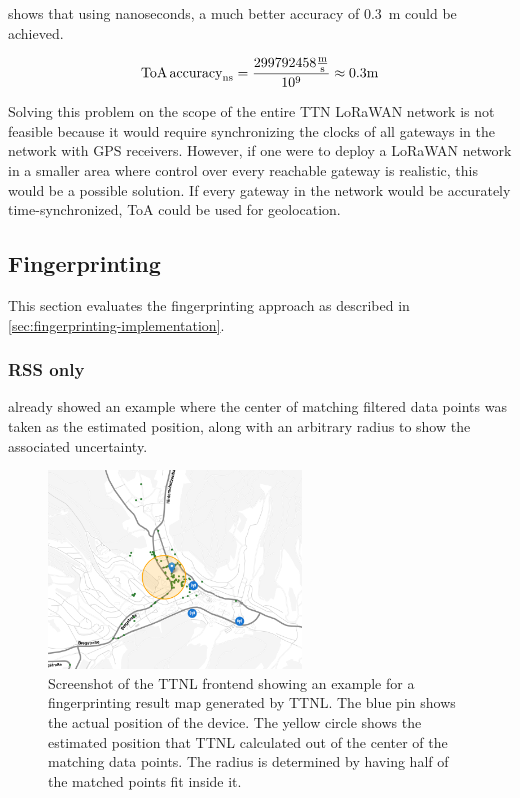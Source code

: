  shows that using nanoseconds, a much better accuracy of \SI{0.3}{\meter} could be achieved.

\begin{equation}\label{eq:toa-accuracy-ttn-nanoseconds}
    \text{ToA\,accuracy}_{\si{\nano\second}} = \frac{299792458 \frac{\si{\meter}}{\si{\second}}}{10^9} \approx 0.3 \si{\meter}
\end{equation}

Solving this problem on the scope of the entire \ac{TTN} \ac{LoRaWAN} network is not feasible because it would require synchronizing the clocks of all gateways in the network with \ac{GPS} receivers.
However, if one were to deploy a \ac{LoRaWAN} network in a smaller area where control over every reachable gateway is realistic, this would be a possible solution.
If every gateway in the network would be accurately time-synchronized, \ac{ToA} could be used for geolocation.

\subsection{Fingerprinting}\label{subsec:conclusion-fingerprinting}

This section evaluates the fingerprinting approach as described in \cref{sec:fingerprinting-implementation}.

\subsubsection{\acf{RSS} only}

 already showed an example where the center of matching filtered data points was taken as the estimated position, along with an arbitrary radius to show the associated uncertainty.

\begin{figure}[htbp]
    \centering
    \includegraphics[width=0.6\textwidth]{pictures/ttn-locator/frontend/fingerprinting/rssi_similarity_map_example_dynamic_radius.png}
    \caption{
        Screenshot of the \ac{TTNL} frontend showing an example for a fingerprinting result map generated by \ac{TTNL}.
        The blue pin shows the actual position of the device.
        The yellow circle shows the estimated position that \ac{TTNL} calculated out of the center of the matching data points.
        The radius is determined by having half of the matched points fit inside it.
    }\label{fig:fingerprinting-map-example-dynamic-radius}
\end{figure}

